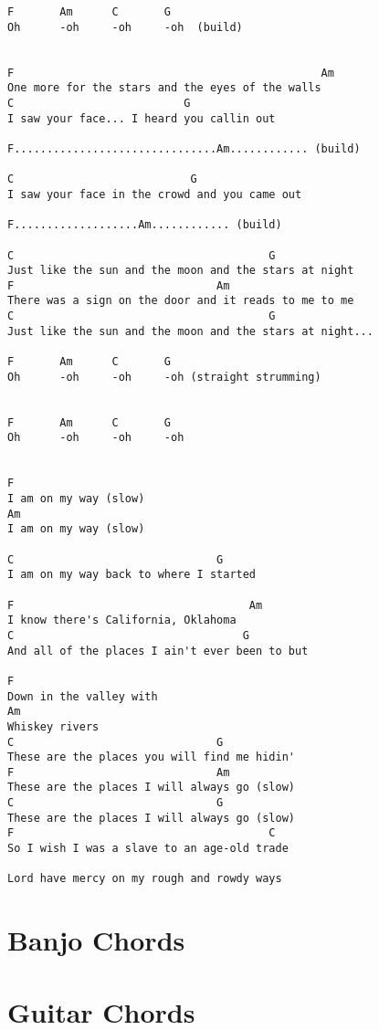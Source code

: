 \documentclass[leqno]{memoir}
\begin{document}
\begin{verbatim}
F       Am      C       G
Oh      -oh     -oh     -oh  (build)


F                                               Am
One more for the stars and the eyes of the walls
C                          G    
I saw your face... I heard you callin out

F...............................Am............ (build)

C                           G
I saw your face in the crowd and you came out

F...................Am............ (build)

C                                       G
Just like the sun and the moon and the stars at night
F                               Am
There was a sign on the door and it reads to me to me 
C                                       G
Just like the sun and the moon and the stars at night...

F       Am      C       G
Oh      -oh     -oh     -oh (straight strumming)


F       Am      C       G
Oh      -oh     -oh     -oh


F       
I am on my way (slow)
Am              
I am on my way (slow)

C                               G
I am on my way back to where I started

F                                    Am
I know there's California, Oklahoma
C                                   G
And all of the places I ain't ever been to but

F
Down in the valley with
Am
Whiskey rivers
C                               G
These are the places you will find me hidin'
F                               Am      
These are the places I will always go (slow)
C                               G
These are the places I will always go (slow)
F                                       C
So I wish I was a slave to an age-old trade

Lord have mercy on my rough and rowdy ways
\end{verbatim}
\newpage





\chapter{Banjo Chords}

\newpage
\chapter{Guitar Chords}

\end{document}
